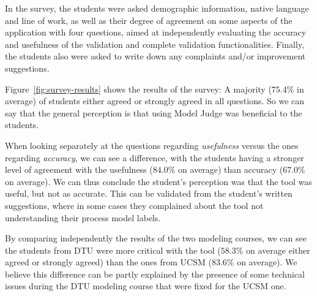 In the survey, the students were asked demographic information, native
language and line of work, as well as their degree of agreement on some aspects
of the application with four questions, aimed at independently evaluating the
accuracy and usefulness of the validation and complete validation
functionalities. Finally, the students also were asked to write down any
complaints and/or improvement suggestions.

Figure~\ref{fig:survey-results} shows the results of the survey: 
A majority ($75.4\%$ in average) of students either agreed or strongly agreed in
all questions. So we can say that the general perception is that using Model Judge
was beneficial to the students.

When looking separately at the questions regarding \emph{usefulness} versus the
ones regarding \emph{accuracy}, we can see a difference, with the students
having a stronger level of agreement with the usefulness ($84.0\%$ on average)
than accuracy ($67.0\%$ on average). We can thus conclude the student's
perception was that the tool was useful, but not as accurate. This can be
validated from the student's written suggestions, where in some cases they
complained about the tool not understanding their process model labels.


By comparing independently the results of the two modeling courses, we can see
the students from DTU were more critical with the tool ($58.3\%$ on average
either agreed or strongly agreed) than the ones from UCSM ($83.6\%$ on average).
We believe this difference can be partly explained by the presence of some
technical issues during the DTU modeling course that were fixed for the UCSM
one.
